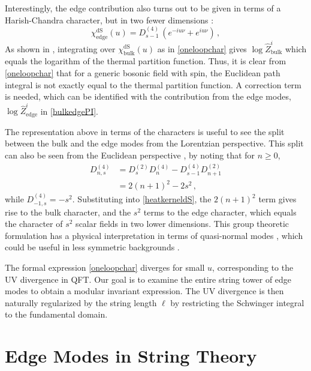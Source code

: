 \documentclass[aps,prl, reprint, superscriptaddress, 10pt]{revtex4-2}
\newcommand{\1}{\textbf{1}}
\newcommand{\+}{{\,+ \,}}
\begin{document}
Interestingly, the edge contribution also turns out to be given in terms of a Harish-Chandra character, but in two fewer dimensions \cite{Anninos:2020hfj}:
\begin{equation} \label{chiedge}
	\chi^{\text{dS}}_{\text{edge}}(u) = D^{(4)}_{s-1} \,
	\left( e^{- i u\nu } + e^{ i u \nu} \right) \, ,
\end{equation}
As shown in \cite{Anninos:2020hfj}, integrating over $\chi^{\text{dS}}_{\text{bulk}}(u)$ as in \eqref{oneloopchar} gives $ \log \hat Z^i_\text{bulk}$ which equals the logarithm of the thermal partition function. Thus, it is clear from \eqref{oneloopchar} that for a generic bosonic field with spin, the Euclidean path integral is not exactly equal to the thermal partition function. A correction term is needed, which can be identified with the contribution from the edge modes, $\log \hat{Z}^i_{\text{edge}}$ in \eqref{bulkedgePI}.

The representation above in terms of the characters is useful to see the split between the bulk and the edge modes from the Lorentzian perspective. This split can also be seen from the Euclidean perspective \cite{Anninos:2020hfj}, by noting that for $n\geq 0$,
\begin{equation}\label{EuclideanSplit}
\begin{split}
	D^{(4)}_{n,s} &= D^{(2)}_s D^{(4)}_n - D^{(4)}_{s-1} D^{(2)}_{n+1} \\
	&=2 ( n+ 1)^2 - 2 s^2 \, ,
\end{split}
\end{equation}
while $D^{(4)}_{-1,s} = -s^2$. Substituting into \eqref{heatkerneldS}, the $2(n+1)^2$ term gives rise to the bulk character, and the $s^2$ terms to the edge character, which equals the character of $s^2$ scalar fields in two lower dimensions. This group theoretic formulation has a physical interpretation in terms of quasi-normal modes \cite{Anninos:2020hfj,Sun:2020sgn}, which could be useful in less symmetric backgrounds \cite{Law:2022zdq,Grewal:2022hlo}.

The formal expression \eqref{oneloopchar} diverges for small $u$, corresponding to the UV divergence in QFT. Our goal is to examine the entire string tower of edge modes to obtain a modular invariant expression. The UV divergence is then naturally regularized by the string length $\ell$ by restricting the Schwinger integral to the fundamental domain.

\section{Edge Modes in String Theory} \label{sec-horizon-bosonic}
\end{document}
